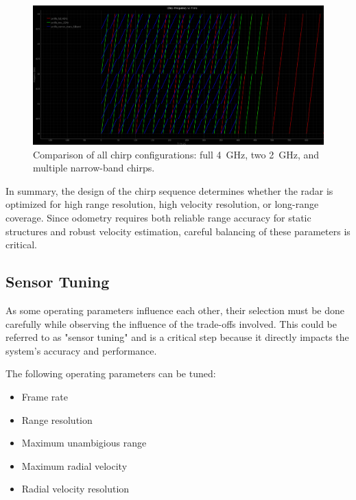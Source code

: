 \begin{figure}[!htbp]
    \centering
    \includegraphics[width=\linewidth]{images/AllCfgTogether.png}
    \caption{Comparison of all chirp configurations: full 4~GHz, two 2~GHz, and multiple narrow-band chirps.}
    \label{fig:AllCfgTogether}
\end{figure}



In summary, the design of the chirp sequence determines whether the radar is optimized for high range resolution, high velocity resolution, or long-range coverage.  
Since odometry requires both reliable range accuracy for static structures and robust velocity estimation, careful balancing of these parameters is critical.  

\subsection{Sensor Tuning}
As some operating parameters influence each other, their selection must be done carefully while observing the influence of the trade-offs involved.
This could be referred to as "sensor tuning" and is a critical step because it directly impacts the system's accuracy and performance.

The following operating parameters can be tuned:
\begin{itemize}
    \item Frame rate
    \item Range resolution
    \item Maximum unambigious range
    \item Maximum radial velocity
    \item Radial velocity resolution
\end{itemize}

